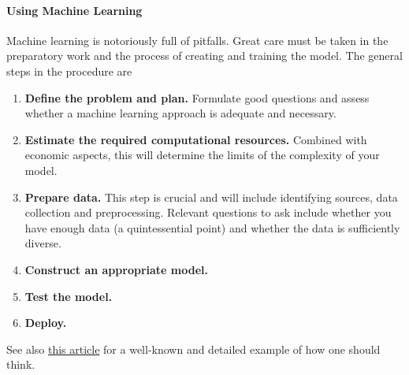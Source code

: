 \paragraph{Using Machine Learning}
Machine learning is notoriously full of pitfalls. Great care must be taken in the preparatory work and the process of creating and training the model. The general steps in the procedure are
\begin{enumerate}
	\item \textbf{Define the problem and plan.} Formulate good questions and assess whether a machine learning approach is adequate and necessary.
	\item \textbf{Estimate the required computational resources.} Combined with economic aspects, this will determine the limits of the complexity of your model.
	\item \textbf{Prepare data.} This step is crucial and will include identifying sources, data collection and preprocessing. Relevant questions to ask include whether you have enough data (a quintessential point) and whether the data is sufficiently diverse.
	\item \textbf{Construct an appropriate model.}
	\item \textbf{Test the model.}
	\item \textbf{Deploy.}
\end{enumerate}

See also \href{https://karpathy.github.io/2019/04/25/recipe/}{this article} for a well-known and detailed example of how one should think.